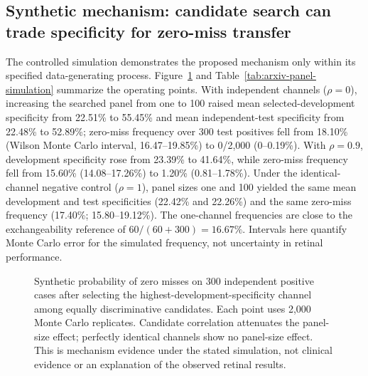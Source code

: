 \documentclass[11pt]{article}
\begin{document}
\subsection{Synthetic mechanism: candidate search can trade specificity for zero-miss transfer}
The controlled simulation demonstrates the proposed mechanism only within its specified data-generating process. Figure~\ref{fig:arxiv-panel-simulation} and Table~\ref{tab:arxiv-panel-simulation} summarize the operating points. With independent channels ($\rho=0$), increasing the searched panel from one to 100 raised mean selected-development specificity from 22.51\% to 55.45\% and mean independent-test specificity from 22.48\% to 52.89\%; zero-miss frequency over 300 test positives fell from 18.10\% (Wilson Monte Carlo interval, 16.47--19.85\%) to 0/2,000 (0--0.19\%). With $\rho=0.9$, development specificity rose from 23.39\% to 41.64\%, while zero-miss frequency fell from 15.60\% (14.08--17.26\%) to 1.20\% (0.81--1.78\%). Under the identical-channel negative control ($\rho=1$), panel sizes one and 100 yielded the same mean development and test specificities (22.42\% and 22.26\%) and the same zero-miss frequency (17.40\%; 15.80--19.12\%). The one-channel frequencies are close to the exchangeability reference of $60/(60+300)=16.67\%$. Intervals here quantify Monte Carlo error for the simulated frequency, not uncertainty in retinal performance.

\begin{figure}[t]
\centering
{}
\caption{Synthetic probability of zero misses on 300 independent positive cases after selecting the highest-development-specificity channel among equally discriminative candidates. Each point uses 2,000 Monte Carlo replicates. Candidate correlation attenuates the panel-size effect; perfectly identical channels show no panel-size effect. This is mechanism evidence under the stated simulation, not clinical evidence or an explanation of the observed retinal results.}
\label{fig:arxiv-panel-simulation}
\end{figure}
\end{document}
